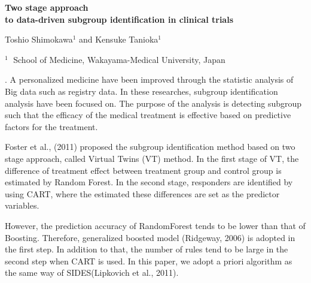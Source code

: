 \documentclass[12pt]{article}
\begin{document}
\begin{flushleft}


{\LARGE\bf Two stage approach  \\ to data-driven subgroup identification in clinical trials}

\vspace{1.0cm}
Toshio Shimokawa$^1$ and Kensuke Tanioka$^1$

\begin{description}
\item $^1 \;$ School of Medicine, Wakayama-Medical University, Japan
\end{description}

\end{flushleft}


\vspace{0.1cm}

. 
A personalized medicine have been improved through the statistic analysis
of Big data such as registry data.
In these researches, subgroup identification analysis have been focused on.
The purpose of the analysis is detecting subgroup  such that the efficacy of the 
medical treatment is effective based on predictive factors for the treatment.  

Foster et al., (2011) proposed the subgroup identification method based on two stage approach,
called Virtual Twins (VT) method.
In the first stage of VT, the difference of treatment effect between treatment group and control group is
estimated by Random Forest.
In the second stage, responders are identified by using CART, where the estimated 
these differences are set as the predictor variables. 

However, 
the prediction accuracy of  RandomForest tends to be lower than that of Boosting.
Therefore, generalized boosted model (Ridgeway, 2006) is adopted in the first step. 
In addition to that, the number of rules tend to be large in the second step when CART is used.
In this paper, we adopt a priori algorithm as the same way of SIDES(Lipkovich et al., 2011).  

\vskip 2mm
\end{document}
